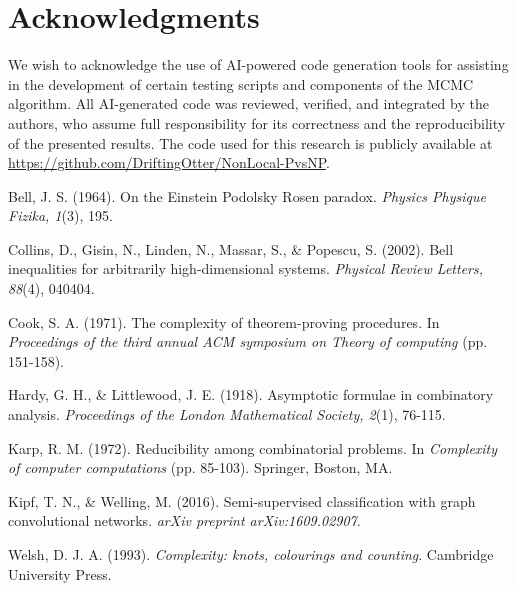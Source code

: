 \documentclass[12pt, letterpaper]{article}
\begin{document}
\section*{Acknowledgments}
We wish to acknowledge the use of AI-powered code generation tools for assisting in the development of certain testing scripts and components of the MCMC algorithm. All AI-generated code was reviewed, verified, and integrated by the authors, who assume full responsibility for its correctness and the reproducibility of the presented results. The code used for this research is publicly available at \href{https://github.com/DriftingOtter/NonLocal-PvsNP}{https://github.com/DriftingOtter/NonLocal-PvsNP}.

\begin{thebibliography}{99}
     Bell, J. S. (1964). On the Einstein Podolsky Rosen paradox. \textit{Physics Physique Fizika, 1}(3), 195.

     Collins, D., Gisin, N., Linden, N., Massar, S., \& Popescu, S. (2002). Bell inequalities for arbitrarily high-dimensional systems. \textit{Physical Review Letters, 88}(4), 040404.
    
     Cook, S. A. (1971). The complexity of theorem-proving procedures. In \textit{Proceedings of the third annual ACM symposium on Theory of computing} (pp. 151-158).
    
     Hardy, G. H., \& Littlewood, J. E. (1918). Asymptotic formulae in combinatory analysis. \textit{Proceedings of the London Mathematical Society, 2}(1), 76-115.

     Karp, R. M. (1972). Reducibility among combinatorial problems. In \textit{Complexity of computer computations} (pp. 85-103). Springer, Boston, MA.
        
     Kipf, T. N., \& Welling, M. (2016). Semi-supervised classification with graph convolutional networks. \textit{arXiv preprint arXiv:1609.02907}.
    
     Welsh, D. J. A. (1993). \textit{Complexity: knots, colourings and counting}. Cambridge University Press.

\end{thebibliography}
\end{document}
